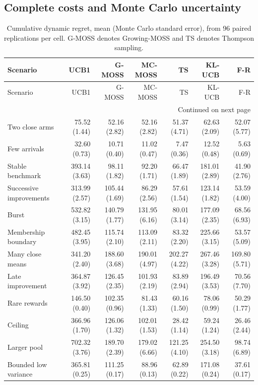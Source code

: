 \documentclass[11pt]{article}
\theoremstyle{remark}
\begin{document}
\subsection{Complete costs and Monte Carlo uncertainty}
\begingroup
\fontsize{7.5}{9.5}\selectfont
\setlength{\tabcolsep}{4pt}
\begin{longtable}{lrrrrrr}
\caption{Cumulative dynamic regret, mean (Monte Carlo standard error), from 96 paired replications per cell. G-MOSS denotes Growing-MOSS and TS denotes Thompson sampling.}\label{tab:reward-se}\\
\toprule
Scenario & UCB1 & G-MOSS & MC-MOSS & TS & KL-UCB & F-R \\
\midrule
\endfirsthead
\toprule
Scenario & UCB1 & G-MOSS & MC-MOSS & TS & KL-UCB & F-R \\
\midrule
\endhead
\midrule
\multicolumn{7}{r}{Continued on next page}\\
\endfoot
\bottomrule
\endlastfoot
Two close arms & 75.52 (1.44) & 52.16 (2.82) & 52.16 (2.82) & 51.37 (4.71) & 62.63 (2.09) & 52.07 (5.77) \\
Few arrivals & 32.60 (0.73) & 10.71 (0.40) & 11.02 (0.47) & 7.47 (0.36) & 12.52 (0.48) & 5.63 (0.69) \\
Stable benchmark & 393.14 (3.63) & 98.11 (1.82) & 92.20 (1.71) & 66.47 (1.89) & 181.01 (2.89) & 41.90 (2.76) \\
Successive improvements & 313.99 (2.57) & 105.44 (1.69) & 86.29 (2.56) & 57.61 (1.54) & 123.14 (1.82) & 53.59 (4.00) \\
Burst & 532.82 (3.15) & 140.79 (1.77) & 131.95 (6.16) & 80.01 (3.14) & 177.09 (2.35) & 68.56 (6.93) \\
Membership boundary & 482.45 (3.95) & 115.74 (2.10) & 113.09 (2.11) & 83.32 (2.20) & 225.66 (3.15) & 53.57 (5.09) \\
Many close means & 341.20 (2.40) & 188.60 (3.68) & 190.01 (4.97) & 202.27 (4.22) & 267.46 (3.28) & 169.80 (5.71) \\
Late improvement & 364.87 (3.92) & 126.45 (2.35) & 101.93 (2.19) & 83.89 (2.94) & 196.49 (3.53) & 70.56 (7.70) \\
Rare rewards & 146.50 (0.40) & 102.35 (0.96) & 81.43 (1.33) & 60.16 (1.50) & 78.06 (0.99) & 50.29 (1.77) \\
Ceiling & 366.96 (1.70) & 126.06 (1.32) & 102.01 (1.53) & 28.42 (1.14) & 59.24 (1.24) & 26.46 (2.44) \\
Larger pool & 702.32 (3.76) & 189.70 (2.39) & 179.02 (6.66) & 121.25 (4.10) & 254.50 (3.18) & 98.74 (6.89) \\
Bounded low variance & 365.81 (0.25) & 111.25 (0.17) & 88.96 (0.13) & 62.89 (0.22) & 171.08 (0.24) & 37.61 (0.17) \\
\end{longtable}
\endgroup
\end{document}
